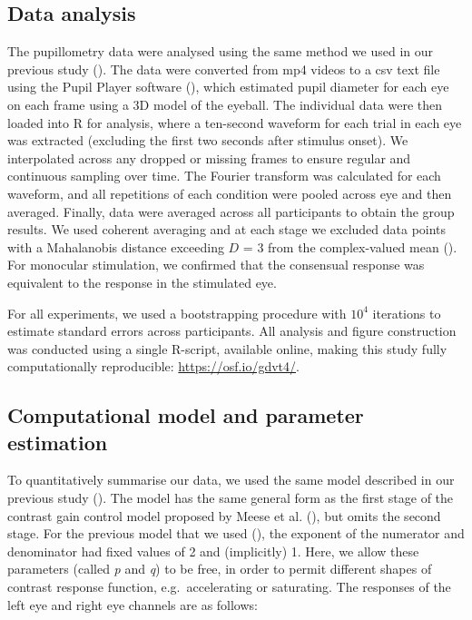 \documentclass[
]{article}
\begin{document}
\subsection{Data analysis}\label{data-analysis}

The pupillometry data were analysed using the same method we used in our previous study (). The data were converted from mp4 videos to a csv text file using the Pupil Player software (), which estimated pupil diameter for each eye on each frame using a 3D model of the eyeball. The individual data were then loaded into R for analysis, where a ten-second waveform for each trial in each eye was extracted (excluding the first two seconds after stimulus onset). We interpolated across any dropped or missing frames to ensure regular and continuous sampling over time. The Fourier transform was calculated for each waveform, and all repetitions of each condition were pooled across eye and then averaged. Finally, data were averaged across all participants to obtain the group results. We used coherent averaging and at each stage we excluded data points with a Mahalanobis distance exceeding \(D\) = 3 from the complex-valued mean (). For monocular stimulation, we confirmed that the consensual response was equivalent to the response in the stimulated eye.

For all experiments, we used a bootstrapping procedure with \ensuremath{10^{4}} iterations to estimate standard errors across participants. All analysis and figure construction was conducted using a single R-script, available online, making this study fully computationally reproducible: \url{https://osf.io/gdvt4/}.

\subsection{Computational model and parameter estimation}\label{computational-model-and-parameter-estimation}

To quantitatively summarise our data, we used the same model described in our previous study (). The model has the same general form as the first stage of the contrast gain control model proposed by Meese et al. (), but omits the second stage. For the previous model that we used (), the exponent of the numerator and denominator had fixed values of 2 and (implicitly) 1. Here, we allow these parameters (called \emph{p} and \emph{q}) to be free, in order to permit different shapes of contrast response function, e.g.~accelerating or saturating. The responses of the left eye and right eye channels are as follows:
\end{document}
